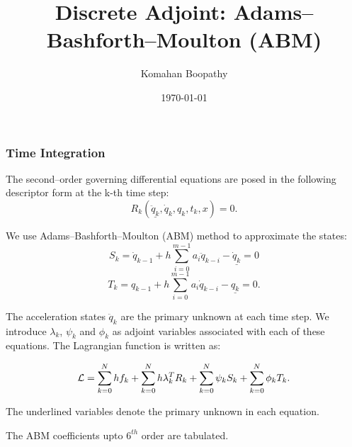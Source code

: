 \documentclass{beamer}
\title[\hspace{-0.2cm} DIRK Adjoint]
{
Discrete Adjoint: Adams--Bashforth--Moulton (ABM)
}
\author[Komahan Boopathy]
{
  \Large {Komahan Boopathy}\\
}
\institute
{
  \large Georgia Institute of Technology\\
 School of Aerospace Engineering\\
 Atlanta, GA
}
\date
{
\small \today
}
\begin{document}
\begin{frame}
  \titlepage
\end{frame}


\begin{frame}[allowframebreaks] \frametitle{Time Integration}

  \tiny{

    The second--order governing differential equations are posed in the following
    descriptor form at the k-th time step:
    $$ R_k(\underline{\ddot{q}_k}, \dot{q}_k, q_k, t_k , x) = 0.$$

    We use Adams--Bashforth--Moulton (ABM) method to approximate the states:
    $$ S_k =   \dot{q}_{k-1}  + h \sum_{i=0}^{m-1} a_i \ddot{q}_{k-i} - \underline{\dot{q}_k}  = 0 $$ 
    $$ T_k =   {q}_{k-1}  + h \sum_{i=0}^{m-1} a_i \dot{q}_{k-i} - \underline{{q}_k} = 0.$$

    The acceleration states $\ddot{q}_k$ are the primary unknown at each time step. We introduce $\lambda_k$, $\psi_k$ and $\phi_k$ as adjoint variables
    associated with each of these equations. The Lagrangian function is written
    as:
    
    $${\cal{L}} = \sum_{k=0}^N h f_k + \sum_{k=0}^N h \lambda_k^T
    R_k + \sum_{k=0}^N \psi_k S_k + \sum_{k=0}^N \phi_k T_k. $$
         
         The underlined variables denote the primary unknown in each
         equation.

    \framebreak

    The ABM coefficients upto $6^{th}$ order are tabulated.

}
\end{frame}
\end{document}
